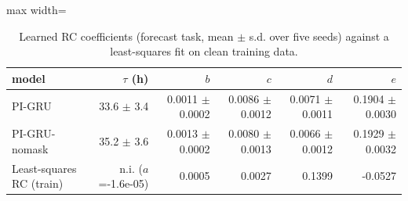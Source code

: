 \begin{table}[H]
\centering\small
\caption{Learned RC coefficients (forecast task, mean $\pm$ s.d. over five seeds) against a least-squares fit on clean training data.}\label{tab:coef_forecast}
\begin{adjustbox}{max width=\textwidth}
\begin{tabular}{lrrrrr}
\toprule
model & $\tau$ (h) & $b$ & $c$ & $d$ & $e$ \\
\midrule
PI-GRU & 33.6 $\pm$ 3.4 & 0.0011 $\pm$ 0.0002 & 0.0086 $\pm$ 0.0012 & 0.0071 $\pm$ 0.0011 & 0.1904 $\pm$ 0.0030 \\
PI-GRU-nomask & 35.2 $\pm$ 3.6 & 0.0013 $\pm$ 0.0002 & 0.0080 $\pm$ 0.0013 & 0.0066 $\pm$ 0.0012 & 0.1929 $\pm$ 0.0032 \\
Least-squares RC (train) & n.i. ($a$=-1.6e-05) & 0.0005 & 0.0027 & 0.1399 & -0.0527 \\
\bottomrule
\end{tabular}
\end{adjustbox}
\end{table}
